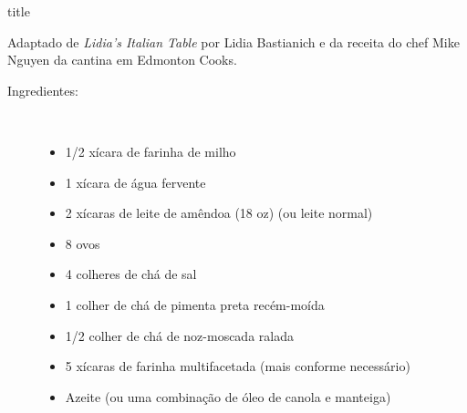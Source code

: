 \documentclass [11pt, letterpaper] {article}
\begin{document}
 {title}

\begin {flushright}
Adaptado de {\it Lidia's Italian Table} por Lidia Bastianich e da receita do chef Mike Nguyen da cantina em Edmonton Cooks.
\end {flushright}

\vspace {0.3in}
\begin {description}

\item [Ingredientes:] \ \\
\begin {itemize}
\item 1/2 xícara de farinha de milho
\item 1 xícara de água fervente
\item 2 xícaras de leite de amêndoa (18 oz) (ou leite normal)
\item 8 ovos
\item 4 colheres de chá de sal
\item 1 colher de chá de pimenta preta recém-moída
\item 1/2 colher de chá de noz-moscada ralada
\item 5 xícaras de farinha multifacetada (mais conforme necessário)
\item Azeite (ou uma combinação de óleo de canola e manteiga)
\end {itemize}



\end{description}
\end{document}
